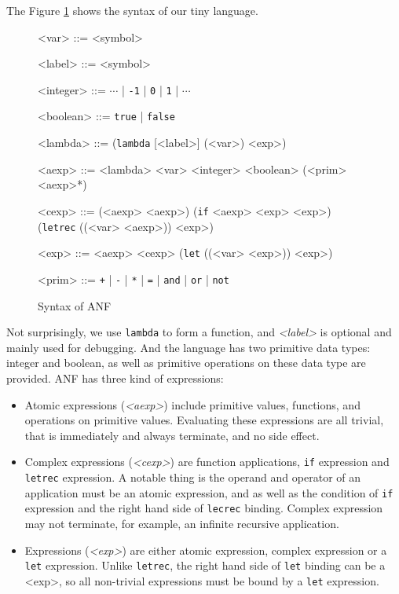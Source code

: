 \documentclass[paper=a4, fontsize=11pt]{scrartcl} %
\numberwithin{equation}{section} %
\numberwithin{figure}{section} %
\numberwithin{table}{section} %
\begin{document}
The Figure \ref{fig:anf} shows the syntax of our tiny language.

\begin{figure}[h!]
\setlength{\grammarparsep}{7pt plus 1pt minus 1pt} %
\setlength{\grammarindent}{8em} %
\begin{grammar}
<var> ::= <symbol>

<label> ::= <symbol>

<integer> ::= $\cdots$ | \texttt{-1} | \texttt{0} | \texttt{1} | $\cdots$

<boolean> ::= \texttt{true} | \texttt{false}

<lambda> ::= (\texttt{lambda} [<label>] (<var>) <exp>)

<aexp> ::= <lambda>
\alt <var>
\alt <integer>
\alt <boolean>
\alt (<prim> <aexp>*)

<cexp> ::= (<aexp> <aexp>)
\alt (\texttt{if} <aexp> <exp> <exp>)
\alt (\texttt{letrec} ((<var> <aexp>)) <exp>)

<exp> ::= <aexp>
\alt <cexp>
\alt (\texttt{let} ((<var> <exp>)) <exp>)

<prim> ::= \texttt{+} | \texttt{-} | \texttt{*} | \texttt{=} | \texttt{and} | \texttt{or} | \texttt{not}
\end{grammar}
\caption{Syntax of ANF}
\label{fig:anf}
\end{figure}

Not surprisingly, we use \texttt{lambda} to form a function, and \textit{<label>} is optional and mainly used for debugging. And the language has two primitive data types: integer and boolean, as well as primitive operations on these data type are provided. ANF has three kind of expressions:

\begin{itemize}
\item Atomic expressions (\textit{<aexp>}) include primitive values, functions, and operations on primitive values. Evaluating these expressions are all trivial, that is immediately and always terminate, and no side effect.

\item Complex expressions (\textit{<cexp>}) are function applications, \texttt{if} expression and \texttt{letrec} expression. A notable thing is the operand and operator of an application must be an atomic expression, and as well as the condition of \texttt{if} expression and the right hand side of \texttt{lecrec} binding. Complex expression may not terminate, for example, an infinite recursive application.

\item Expressions (\textit{<exp>}) are either atomic expression, complex expression or a \texttt{let} expression. Unlike \texttt{letrec}, the right hand side of \texttt{let} binding can be a <exp>, so all non-trivial expressions must be bound by a \texttt{let} expression.
\end{itemize}
\end{document}
